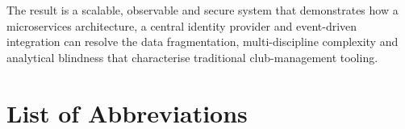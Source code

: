 \documentclass[12pt,a4paper]{report}
\begin{document}
The result is a scalable, observable and secure system that demonstrates how a
microservices architecture, a central identity provider and event-driven
integration can resolve the data fragmentation, multi-discipline complexity and
analytical blindness that characterise traditional club-management tooling.

\cleardoublepage
\tableofcontents

\cleardoublepage
{}
\listoffigures

\cleardoublepage
{}
\listoftables

\cleardoublepage
\chapter*{List of Abbreviations}
\end{document}
